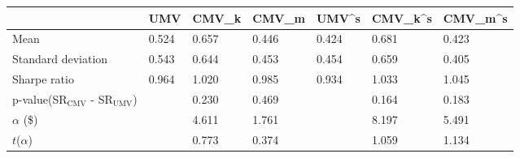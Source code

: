 \begin{tabular}{lllllll}
\toprule
 & UMV & CMV_k & CMV_m & UMV^s & CMV_k^s & CMV_m^s \\
\midrule
Mean & 0.524 & 0.657 & 0.446 & 0.424 & 0.681 & 0.423 \\
Standard deviation & 0.543 & 0.644 & 0.453 & 0.454 & 0.659 & 0.405 \\
Sharpe ratio & 0.964 & 1.020 & 0.985 & 0.934 & 1.033 & 1.045 \\
p-value(SR$_{\text{CMV}}$ - SR$_{\text{UMV}}$) &  & 0.230 & 0.469 &  & 0.164 & 0.183 \\
$\alpha$ (\$) &  & 4.611 & 1.761 &  & 8.197 & 5.491 \\
$t$($\alpha$) &  & 0.773 & 0.374 &  & 1.059 & 1.134 \\
\bottomrule
\end{tabular}
